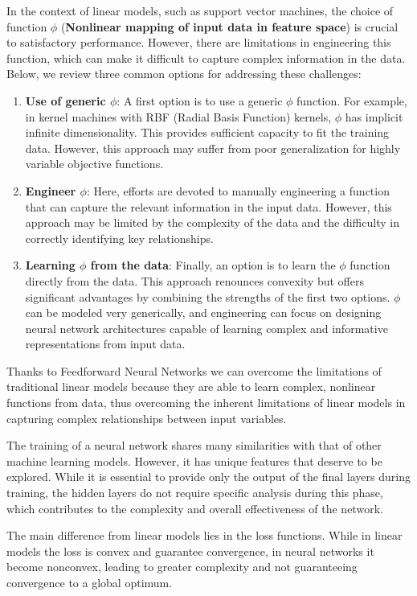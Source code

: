In the context of linear models, such as support vector machines, the choice of function \( \phi \) (\textbf{Nonlinear mapping of input data in feature space}) is crucial to satisfactory performance. However, there are limitations in engineering this function, which can make it difficult to capture complex information in the data. Below, we review three common options for addressing these challenges:
\begin{enumerate}
    \item \textbf{Use of generic \( \phi \)}: A first option is to use a generic \( \phi \) function. For example, in kernel machines with RBF (Radial Basis Function) kernels, \( \phi \) has implicit infinite dimensionality. This provides sufficient capacity to fit the training data. However, this approach may suffer from poor generalization for highly variable objective functions.
    \item \textbf{Engineer \( \phi \)}: Here, efforts are devoted to manually engineering a function that can capture the relevant information in the input data. However, this approach may be limited by the complexity of the data and the difficulty in correctly identifying key relationships.
    \item \textbf{Learning \( \phi \) from the data}: Finally, an option is to learn the \( \phi \) function directly from the data. This approach renounces convexity but offers significant advantages by combining the strengths of the first two options. \( \phi \) can be modeled very generically, and engineering can focus on designing neural network architectures capable of learning complex and informative representations from input data.
\end{enumerate}

Thanks to Feedforward Neural Networks we can overcome the limitations of traditional linear models because they are able to learn complex, nonlinear functions from data, thus overcoming the inherent limitations of linear models in capturing complex relationships between input variables.

The training of a neural network shares many similarities with that of other machine learning models. However, it has unique features that deserve to be explored. While it is essential to provide only the output of the final layers during training, the hidden layers do not require specific analysis during this phase, which contributes to the complexity and overall effectiveness of the network.

The main difference from linear models lies in the loss functions. While in linear models the loss is convex and guarantee convergence, in neural networks it become nonconvex, leading to greater complexity and not guaranteeing convergence to a global optimum.

